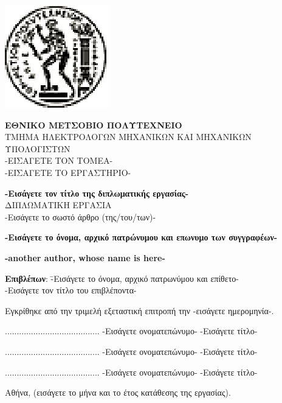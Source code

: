 \documentclass[12pt, twoside, a4paper]{report}
\begin{document}
\maketitle
\newpage
\hspace{10pt}
\newpage
\includegraphics{pyrforos.eps}
\noindent
\parbox[b]{0.8\textwidth} {\textbf{
\noindent
\normalsize{Ε}\small{ΘΝΙΚΟ}
\normalsize{Μ}\small{ΕΤΣΟΒΙΟ}
\normalsize{Π}\small{ΟΛΥΤΕΧΝΕΙΟ}} \\
\small
ΤΜΗΜΑ
ΗΛΕΚΤΡΟΛΟΓΩΝ
ΜΗΧΑΝΙΚΩΝ
ΚΑΙ
ΜΗΧΑΝΙΚΩΝ
ΥΠΟΛΟΓΙΣΤΩΝ \\
-ΕΙΣΑΓΕΤΕ ΤΟΝ ΤΟΜΕΑ- \\
-ΕΙΣΑΓΕΤΕ ΤΟ ΕΡΓΑΣΤΗΡΙΟ-
}

\begin{center}
\vspace{8ex}
\large \textbf{-Εισάγετε τον τίτλο της διπλωματικής εργασίας-} \\
\vspace{10ex}
\large
ΔΙΠΛΩΜΑΤΙΚΗ ΕΡΓΑΣΙΑ \\
\vspace{2ex}
\normalsize
-Εισάγετε το σωστό άρθρο (της/του/των)- \\
\vspace{2ex}
\parbox[c]{0.4\textwidth} { \center\textbf{
-Εισάγετε το όνομα, αρχικό πατρώνυμου και επωνυμο των συγγραφέων- }}
\parbox[c]{0.4\textwidth} { \center\textbf{
	-another author, whose name is here- }}
\vspace{10ex}
\flushleft
\begin{tabbing}
\textbf{Επιβλέπων}: \= -Εισάγετε το όνομα, αρχικό πατρωνύμου
			και επίθετο- \\
		    \> -Εισάγετε τον τίτλο του επιβλέποντα-
\end{tabbing}
\end{center}


\noindent
Εγκρίθηκε από την τριμελή εξεταστική επιτροπή την -εισάγετε ημερομηνία-.

\begin{center}
\scriptsize
\parbox[b]{0.3\textwidth} {\center
	........................................
	-Εισάγετε ονοματεπώνυμο-
	-Εισάγετε τίτλο-
}
\parbox[b]{0.3\textwidth} {\center
	........................................
	-Εισάγετε ονοματεπώνυμο-
	-Εισάγετε τίτλο-
}
\parbox[b]{0.3\textwidth} {\center
	........................................
	-Εισάγετε ονοματεπώνυμο-
	-Εισάγετε τίτλο-
}
\end{center}
\vspace{10ex}
\normalsize
\noindent
Αθήνα, (εισάγετε το μήνα και το έτος κατάθεσης της εργασίας).
\newpage
\hspace{10pt}
\end{document}
